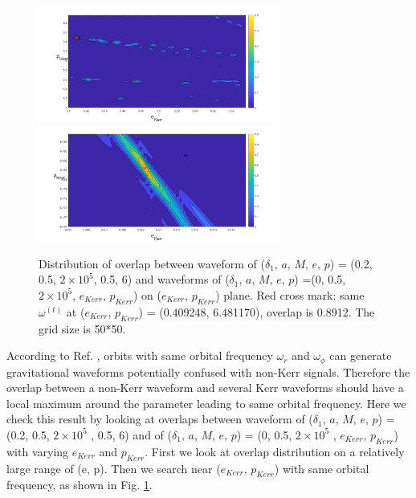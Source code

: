 \documentclass{article}
\begin{document}
\begin{figure}[]
	\centering
	\includegraphics[width=8cm]{OLdist.png}
	\includegraphics[width=8cm]{OLdist2.png}
	
	\caption{Distribution of overlap between waveform of ($\delta_1,\, a,\, M,\, e,\, p$) = (0.2, 0.5, $2 \times 10^5 $, 0.5, 6) and waveforms of ($\delta_1,\, a,\, M,\, e,\, p$) =(0, 0.5, $2 \times 10^5 $, $e_{Kerr}$, $p_{Kerr}$) on ($e_{Kerr}$, $p_{Kerr}$) plane. Red cross mark: same $\omega^{(t)}$ at ($e_{Kerr}$, $p_{Kerr}$) = (0.409248, 6.481170), overlap is 0.8912. The grid size is 50*50.}
	\label{overlapdist}
\end{figure}

According to Ref. \cite{sameOmg}, orbits with same orbital frequency $\omega_r$ and $\omega_\phi$ can generate gravitational waveforms potentially confused with non-Kerr signals. Therefore the overlap between a non-Kerr waveform and several Kerr waveforms should have a local maximum around the parameter leading to same orbital frequency. Here we check this result by looking at overlaps between waveform of ($\delta_1,\, a,\, M,\, e,\, p$) = (0.2, 0.5, $2 \times 10^5 $ , 0.5, 6) and of ($\delta_1,\, a,\, M,\, e,\, p$) = (0, 0.5, $2 \times 10^5 $ , $e_{Kerr}$, $p_{Kerr}$) with varying $e_{Kerr}$ and $p_{Kerr}$. First we look at overlap distribution on a relatively large range of (e, p). Then we search near ($e_{Kerr}$, $p_{Kerr}$) with same orbital frequency, as shown in Fig. \ref{overlapdist}. 
\end{document}
